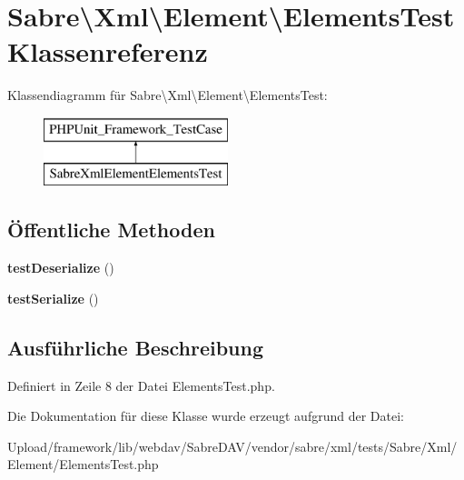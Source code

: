 \hypertarget{class_sabre_1_1_xml_1_1_element_1_1_elements_test}{}\section{Sabre\textbackslash{}Xml\textbackslash{}Element\textbackslash{}Elements\+Test Klassenreferenz}
\label{class_sabre_1_1_xml_1_1_element_1_1_elements_test}
Klassendiagramm für Sabre\textbackslash{}Xml\textbackslash{}Element\textbackslash{}Elements\+Test\+:\begin{figure}[H]
\begin{center}
\leavevmode
\includegraphics[height=2.000000cm]{class_sabre_1_1_xml_1_1_element_1_1_elements_test}
\end{center}
\end{figure}
\subsection*{Öffentliche Methoden}
\begin{DoxyCompactItemize}
\item 
\mbox{\label{class_sabre_1_1_xml_1_1_element_1_1_elements_test_a1970bca92aba1198b961df087ddab8a7}} 
{\bfseries test\+Deserialize} ()
\item 
\mbox{\label{class_sabre_1_1_xml_1_1_element_1_1_elements_test_a9c0820a43575fdfe94ab7407604df25d}} 
{\bfseries test\+Serialize} ()
\end{DoxyCompactItemize}


\subsection{Ausführliche Beschreibung}


Definiert in Zeile 8 der Datei Elements\+Test.\+php.



Die Dokumentation für diese Klasse wurde erzeugt aufgrund der Datei\+:\begin{DoxyCompactItemize}
\item 
Upload/framework/lib/webdav/\+Sabre\+D\+A\+V/vendor/sabre/xml/tests/\+Sabre/\+Xml/\+Element/Elements\+Test.\+php\end{DoxyCompactItemize}
